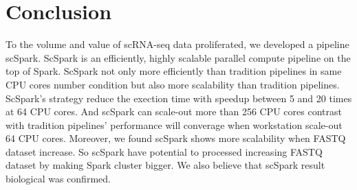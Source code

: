 \documentclass[conference]{IEEEtran}
\begin{document}
\section{Conclusion}
To the volume and value of scRNA-seq data proliferated, we developed a pipeline scSpark.
ScSpark is an efficiently, highly scalable parallel compute pipeline on the top of Spark.
ScSpark not only more efficiently than tradition pipelines in same CPU cores number condition but also more scalability than tradition pipelines.
ScSpark's strategy reduce the exection time with speedup between 5 and 20 times at 64 CPU cores.
And scSpark can scale-out more than 256 CPU cores contrast with tradition pipelines' performance will converage when workstation scale-out 64 CPU cores.
Moreover, we found scSpark shows more scalability when FASTQ dataset increase.
So scSpark have potential to processed increasing FASTQ dataset by making Spark cluster bigger.
We also believe that scSpark result biological was confirmed. 



\end{document}
